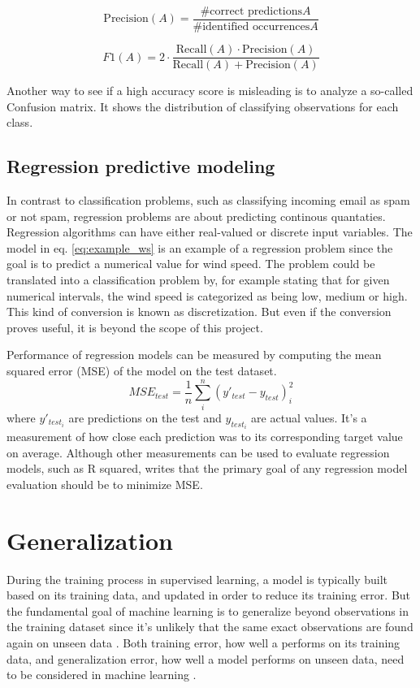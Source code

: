 \begin{equation} \label{eq:precision}
	\mbox{Precision}(A) = \frac{\mbox{\#correct predictions} A}{\mbox{\#identified occurrences} A}
\end{equation}

\begin{equation} \label{eq:f1}
	F1(A) = 2 \cdot \frac{\mbox{Recall}(A) \cdot \mbox{Precision}(A)}{\mbox{Recall}(A) + \mbox{Precision}(A)}
\end{equation}

Another way to see if a high accuracy score is misleading is to analyze a so-called Confusion matrix. It shows the distribution of classifying observations for each class.


	\subsection{Regression predictive modeling} \label{sec:regression}
	In contrast to classification problems, such as classifying incoming email as spam or not spam, regression problems are about predicting continous quantaties. Regression algorithms can have either real-valued or discrete input variables. The model in eq. \ref{eq:example_ws} is an example of a regression problem since the goal is to predict a numerical value for wind speed. The problem could be translated into a classification problem by, for example stating that for given numerical intervals, the wind speed is categorized as being low, medium or high. This kind of conversion is known as discretization. But even if the conversion proves useful, it is beyond the scope of this project. 

	Performance of regression models can be measured by computing the mean squared error (MSE) of the model on the test dataset. 
\begin{equation}
	MSE_{test} = \frac{1}{n} \sum_{i}^{n}(y'_{test} - y_{test})_{i}^2
\end{equation}
where $y'_{test_i}$ are predictions on the test and $y_{test_i}$ are actual values. It's a measurement of how close each prediction was to its corresponding target value on average. Although other measurements can be used to evaluate regression models, such as R squared, \cite{BOOK:13} writes that the primary goal of any regression model evaluation should be to minimize MSE.


\section{Generalization} \label{sec:generalization}
	During the training process in supervised learning, a model is typically built based on its training data, and updated in order to reduce its training error. But the fundamental goal of machine learning is to generalize beyond observations in the training dataset since it's unlikely that the same exact observations are found again on unseen data \cite{ARTICLE:3}. Both training error, how well a performs on its training data, and generalization error, how well a model performs on unseen data, need to be considered in machine learning \cite{BOOK:1}.

